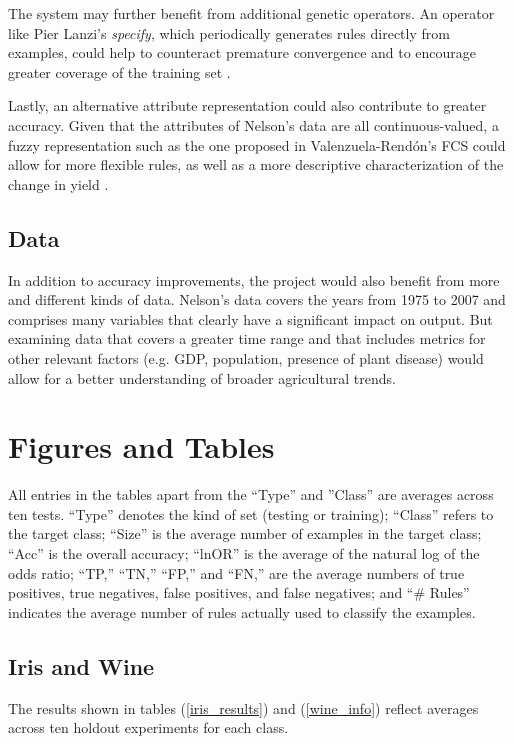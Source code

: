 \documentclass[12pt]{article}
\begin{document}
The system may further benefit from additional genetic operators. An operator like Pier Lanzi's \emph{specify}, which periodically generates rules directly from examples, could help to counteract premature convergence and to encourage greater coverage of the training set \cite{lanzi_study_1997}.

Lastly, an alternative attribute representation could also contribute to greater accuracy. Given that the attributes of Nelson's data are all continuous-valued, a fuzzy representation such as the one proposed in 
Valenzuela-Rend\'on's FCS could allow for more flexible rules, as well as a more descriptive characterization of the change in yield \cite{manuel_valenzuela-rendon_fuzzy_1991}.

\subsection{Data}

In addition to accuracy improvements, the project would also benefit from more and different kinds of data. Nelson's data covers the years from 1975 to 2007 and comprises many variables that clearly have a significant impact on output. But examining data that covers a greater time range and that includes metrics for other relevant factors (e.g. GDP, population, presence of plant disease) would allow for a better understanding of broader agricultural trends.

\section{Figures and Tables}

All entries in the tables apart from the ``Type'' and  ''Class'' are averages across ten tests. ``Type'' denotes the kind of set (testing or training); ``Class'' refers to the target class; ``Size'' is the average number of examples in the target class; ``Acc'' is the overall accuracy; ``lnOR'' is the average of the natural log of the odds ratio; ``TP,'' ``TN,'' ``FP,'' and ``FN,'' are the average numbers of true positives, true negatives, false positives, and false negatives; and ``\# Rules'' indicates the average number of rules actually used to classify the examples.

\subsection{Iris and Wine}

The results shown in tables (\ref{iris_results}) and (\ref{wine_info}) reflect averages across ten holdout experiments for each class.
\end{document}

